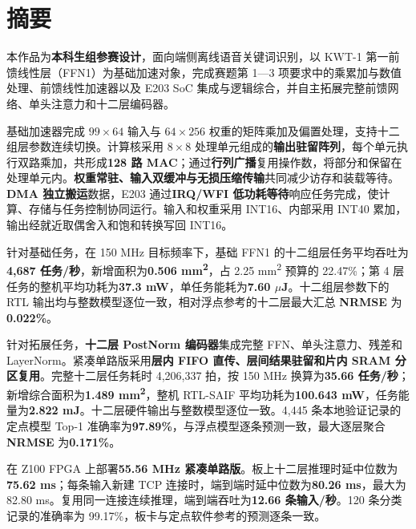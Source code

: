 \documentclass[UTF8,a4paper,zihao=-4,fontset=none,openany,oneside]{ctexrep}
\begin{document}



\chapter*{摘\quad 要}

本作品为\textbf{本科生组参赛设计}，面向端侧离线语音关键词识别，以 KWT-1 第一前馈线性层（FFN1）为基础加速对象，完成赛题第 1—3 项要求中的乘累加与数值处理、前馈线性加速器以及 E203 SoC 集成与逻辑综合，并自主拓展完整前馈网络、单头注意力和十二层编码器。

基础加速器完成 $99\times64$ 输入与 $64\times256$ 权重的矩阵乘加及偏置处理，支持十二组层参数连续切换。计算核采用 $8\times8$ 处理单元组成的\textbf{输出驻留阵列}，每个单元执行双路乘加，共形成\textbf{128 路 MAC}；通过\textbf{行列广播}复用操作数，将部分和保留在处理单元内。\textbf{权重常驻、输入双缓冲与无损压缩传输}共同减少访存和装载等待。\textbf{DMA 独立搬运}数据，E203 通过\textbf{IRQ/WFI 低功耗等待}响应任务完成，使计算、存储与任务控制协同运行。输入和权重采用 INT16、内部采用 INT40 累加，输出经就近取偶舍入和饱和转换写回 INT16。


针对基础任务，在 150 MHz 目标频率下，基础 FFN1 的十二组层任务平均吞吐为\textbf{4,687 任务/秒}，新增面积为\textbf{0.506 mm\textsuperscript{2}}，占 2.25 mm\textsuperscript{2} 预算的 22.47\%；第 4 层任务的整机平均功耗为\textbf{37.3 mW}，单任务能耗为\textbf{7.60 $\mu$J}。十二组层参数下的 RTL 输出均与整数模型逐位一致，相对浮点参考的十二层最大汇总 \textbf{NRMSE} 为\textbf{0.022\%}。

针对拓展任务，\textbf{十二层 PostNorm 编码器}集成完整 FFN、单头注意力、残差和 LayerNorm。紧凑单路版采用\textbf{层内 FIFO 直传、层间结果驻留和片内 SRAM 分区复用}。完整十二层任务耗时 4,206,337 拍，按 150 MHz 换算为\textbf{35.66 任务/秒}；新增综合面积为\textbf{1.489 mm\textsuperscript{2}}，整机 RTL-SAIF 平均功耗为\textbf{100.643 mW}，任务能量为\textbf{2.822 mJ}。十二层硬件输出与整数模型逐位一致。4,445 条本地验证记录的定点模型 Top-1 准确率为\textbf{97.89\%}，与浮点模型逐条预测一致，最大逐层聚合 \textbf{NRMSE} 为\textbf{0.171\%}。

在 Z100 FPGA 上部署\textbf{55.56 MHz 紧凑单路版}。板上十二层推理时延中位数为\textbf{75.62 ms}；每条输入新建 TCP 连接时，端到端时延中位数为\textbf{80.26 ms}，最大为 82.80 ms。复用同一连接连续推理，端到端吞吐为\textbf{12.66 条输入/秒}。120 条分类记录的准确率为 99.17\%，板卡与定点软件参考的预测逐条一致。
\end{document}
